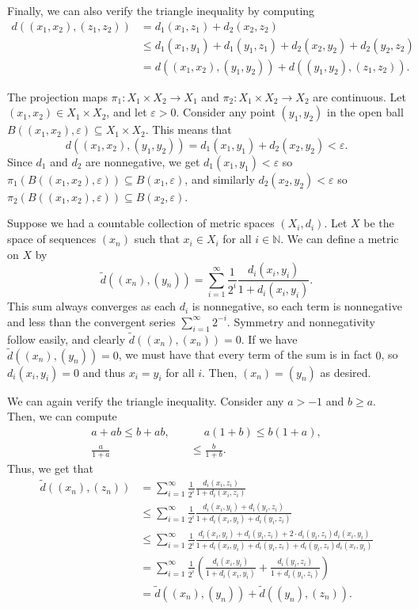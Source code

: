 \documentclass[12pt]{article}
\begin{document}
Finally, we can also verify the triangle inequality by computing
\begin{align*}
    d((x_1, x_2), (z_1, z_2)) &= d_1(x_1, z_1) + d_2(x_2, z_2) \\
    &\le d_1(x_1, y_1) + d_1(y_1, z_1) + d_2(x_2, y_2) + d_2(y_2, z_2) \\
    &= d((x_1, x_2), (y_1, y_2)) + d((y_1, y_2), (z_1, z_2)).
\end{align*}

The projection maps $\pi_1 : X_1 \times X_2 \to X_1$ and $\pi_2 : X_1 \times X_2 \to X_2$ are continuous. Let $(x_1, x_2) \in X_1 \times X_2$, and let $\varepsilon > 0$. Consider any point $(y_1, y_2)$ in the open ball $B((x_1, x_2), \varepsilon) \subseteq X_1 \times X_2$. This means that \[d((x_1, x_2), (y_1, y_2)) = d_1(x_1, y_1) + d_2(x_2, y_2) < \varepsilon. \]
Since $d_1$ and $d_2$ are nonnegative, we get $d_1(x_1, y_1) < \varepsilon$ so $\pi_1(B((x_1, x_2), \varepsilon)) \subseteq B(x_1, \varepsilon)$, and similarly $d_2(x_2, y_2) < \varepsilon$ so $\pi_2(B((x_1, x_2), \varepsilon)) \subseteq B(x_2, \varepsilon)$.

Suppose we had a countable collection of metric spaces $(X_i, d_i)$. Let $X$ be the space of sequences $(x_n)$ such that $x_i \in X_i$ for all $i \in \mathbb N$. We can define a metric on $X$ by
\[
\tilde{d}((x_n), (y_n)) = \sum_{i=1}^\infty \frac{1}{2^i} \frac{d_i(x_i, y_i)}{1 + d_i(x_i, y_i)}.
\]
This sum always converges as each $d_i$ is nonnegative, so each term is nonnegative and less than the convergent series $\sum_{i=1}^\infty 2^{-i}$. Symmetry and nonnegativity follow easily, and clearly $\tilde{d}((x_n), (x_n)) = 0$. If we have $\tilde{d}((x_n), (y_n)) = 0$, we must have that every term of the sum is in fact $0$, so $d_i(x_i, y_i) = 0$ and thus $x_i = y_i$ for all $i$. Then, $(x_n) = (y_n)$ as desired. 

We can again verify the triangle inequality. Consider any $a > -1$ and $b \ge a$. Then, we can compute \begin{align*}
a + ab \le b + ab, \quad&\;\quad a(1 + b) \le b(1 + a), \\
\frac{a}{1+ a} &\le \frac{b}{1+b}.
\end{align*}
Thus, we get that
\begin{align*}
    \tilde{d}((x_n), (z_n)) &= \sum_{i=1}^\infty \frac{1}{2^i} \frac{d_i(x_i, z_i)}{1 + d_i(x_i, z_i)} \\ 
    &\le \sum_{i=1}^\infty \frac{1}{2^i} \frac{d_i(x_i, y_i) + d_i(y_i, z_i)}{1 + d_i(x_i, y_i) + d_i(y_i, z_i)} \\
    &\le \sum_{i=1}^\infty \frac{1}{2^i} \frac{d_i(x_i, y_i) + d_i(y_i, z_i) + 2\cdot d_i(y_i, z_i) d_i(x_i, y_i)}{1 + d_i(x_i, y_i) + d_i(y_i, z_i)+ d_i(y_i, z_i) d_i(x_i, y_i)} \\
    &= \sum_{i=1}^\infty \frac{1}{2^i} \left( \frac{d_i(x_i, y_i)}{1 + d_i(x_i, y_i)} +  \frac{d_i(y_i, z_i)}{1 + d_i(y_i, z_i)} \right) \\
    &= \tilde{d}((x_n), (y_n)) + \tilde{d}((y_n), (z_n)).
\end{align*}
\end{document}
